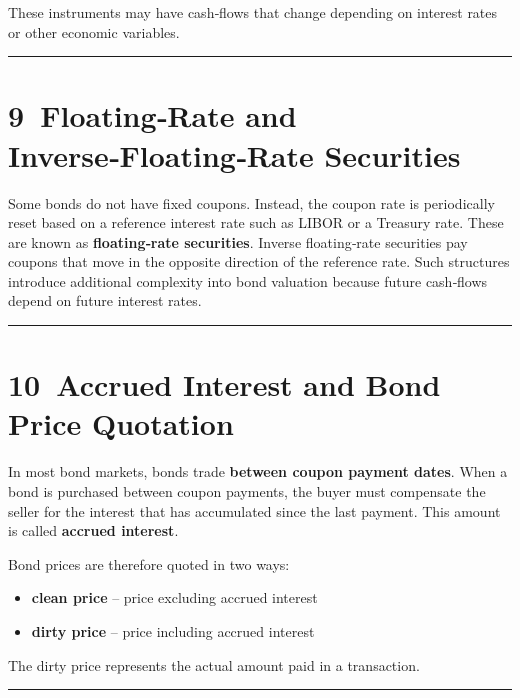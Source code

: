 \documentclass[
  letterpaper,
  DIV=11,
  numbers=noendperiod]{scrartcl}
\providecommand{\tightlist}{%
  \setlength{\itemsep}{0pt}\setlength{\parskip}{0pt}}
\begin{document}
These instruments may have cash‑flows that change depending on interest
rates or other economic variables.

\begin{center}\rule{0.5\linewidth}{0.5pt}\end{center}

\section{9~Floating‑Rate and Inverse‑Floating‑Rate
Securities}\label{floatingrate-and-inversefloatingrate-securities}

Some bonds do not have fixed coupons. Instead, the coupon rate is
periodically reset based on a reference interest rate such as LIBOR or a
Treasury rate. These are known as \textbf{floating‑rate securities}.
Inverse floating‑rate securities pay coupons that move in the opposite
direction of the reference rate. Such structures introduce additional
complexity into bond valuation because future cash‑flows depend on
future interest rates.

\begin{center}\rule{0.5\linewidth}{0.5pt}\end{center}

\section{10~Accrued Interest and Bond Price
Quotation}\label{accrued-interest-and-bond-price-quotation}

In most bond markets, bonds trade \textbf{between coupon payment dates}.
When a bond is purchased between coupon payments, the buyer must
compensate the seller for the interest that has accumulated since the
last payment. This amount is called \textbf{accrued interest}.

Bond prices are therefore quoted in two ways:

\begin{itemize}
\tightlist
\item
  \textbf{clean price} -- price excluding accrued interest\\
\item
  \textbf{dirty price} -- price including accrued interest
\end{itemize}

The dirty price represents the actual amount paid in a transaction.

\begin{center}\rule{0.5\linewidth}{0.5pt}\end{center}
\end{document}
